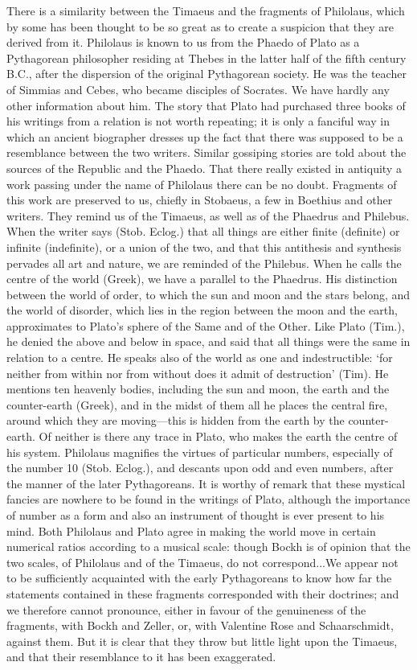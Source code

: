 There is a similarity between the Timaeus and the fragments of Philolaus,
which by some has been thought to be so great as to create a suspicion
that they are derived from it. Philolaus is known to us from the Phaedo of
Plato as a Pythagorean philosopher residing at Thebes in the latter half
of the fifth century B.C., after the dispersion of the original
Pythagorean society. He was the teacher of Simmias and Cebes, who became
disciples of Socrates. We have hardly any other information about him. The
story that Plato had purchased three books of his writings from a relation
is not worth repeating; it is only a fanciful way in which an ancient
biographer dresses up the fact that there was supposed to be a resemblance
between the two writers. Similar gossiping stories are told about the
sources of the Republic and the Phaedo. That there really existed in
antiquity a work passing under the name of Philolaus there can be no
doubt. Fragments of this work are preserved to us, chiefly in Stobaeus, a
few in Boethius and other writers. They remind us of the Timaeus, as well
as of the Phaedrus and Philebus. When the writer says (Stob. Eclog.) that
all things are either finite (definite) or infinite (indefinite), or a
union of the two, and that this antithesis and synthesis pervades all art
and nature, we are reminded of the Philebus. When he calls the centre of
the world (Greek), we have a parallel to the Phaedrus. His distinction
between the world of order, to which the sun and moon and the stars
belong, and the world of disorder, which lies in the region between the
moon and the earth, approximates to Plato’s sphere of the Same and of the
Other. Like Plato (Tim.), he denied the above and below in space, and said
that all things were the same in relation to a centre. He speaks also of
the world as one and indestructible: ‘for neither from within nor from
without does it admit of destruction’ (Tim). He mentions ten heavenly
bodies, including the sun and moon, the earth and the counter-earth
(Greek), and in the midst of them all he places the central fire, around
which they are moving—this is hidden from the earth by the
counter-earth. Of neither is there any trace in Plato, who makes the earth
the centre of his system. Philolaus magnifies the virtues of particular
numbers, especially of the number 10 (Stob. Eclog.), and descants upon odd
and even numbers, after the manner of the later Pythagoreans. It is worthy
of remark that these mystical fancies are nowhere to be found in the
writings of Plato, although the importance of number as a form and also an
instrument of thought is ever present to his mind. Both Philolaus and
Plato agree in making the world move in certain numerical ratios according
to a musical scale: though Bockh is of opinion that the two scales, of
Philolaus and of the Timaeus, do not correspond...We appear not to be
sufficiently acquainted with the early Pythagoreans to know how far the
statements contained in these fragments corresponded with their doctrines;
and we therefore cannot pronounce, either in favour of the genuineness of
the fragments, with Bockh and Zeller, or, with Valentine Rose and
Schaarschmidt, against them. But it is clear that they throw but little
light upon the Timaeus, and that their resemblance to it has been
exaggerated.

